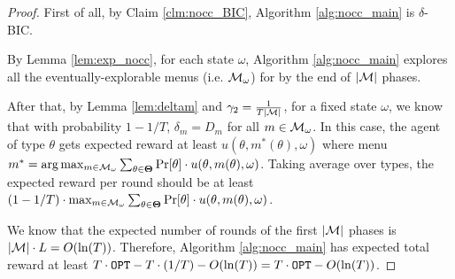 \begin{proof}

First of all, by Claim \ref{clm:nocc_BIC}, Algorithm \ref{alg:nocc_main} is $\delta$-BIC.

By Lemma \ref{lem:exp_nocc}, for each state $\omega$, Algorithm \ref{alg:nocc_main} explores all the eventually-explorable menus (i.e. $\mathcal{M}_{\omega}$) for by the end of $|\mathcal{M}|$ phases.

After that, by Lemma \ref{lem:deltam} and $\gamma_2 = \frac{1}{T|\mathcal{M}|}$, for a fixed state $\omega$, we know that with probability $1- 1/T$, $\delta_m = D_m$ for all $m \in \mathcal{M}_{\omega}$. In this case, the agent of type $\theta$ gets expected reward at least $u(\theta,m^*(\theta),\omega)$ where menu $m^* =\arg\max_{m \in \mathcal{M}_{\omega}} \sum_{\theta \in \bold{\Theta}} \Pr[\theta] \cdot u(\theta, m(\theta), \omega)$. Taking average over types, the expected reward per round should be at least $(1-1/T) \cdot \max_{m \in \mathcal{M}_{\omega}} \sum_{\theta \in \bold{\Theta}} \Pr[\theta] \cdot u(\theta, m(\theta), \omega)$.

We know that the expected number of rounds of the first $|\mathcal{M}|$ phases is $|\mathcal{M}| \cdot L = O(\ln(T))$. Therefore, Algorithm \ref{alg:nocc_main} has expected total reward at least $T \cdot \mathtt{OPT}- T \cdot (1/T) - O(\ln(T)) = T\cdot \mathtt{OPT} - O(\ln(T))$.

\end{proof}


